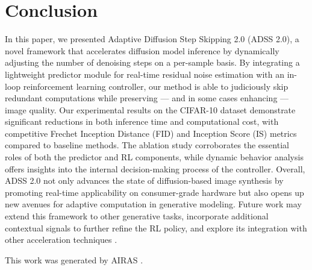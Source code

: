 \documentclass{article} %
\begin{document}
\section{Conclusion}
\label{sec:conclusion}
In this paper, we presented Adaptive Diffusion Step Skipping 2.0 (ADSS 2.0), a novel framework that accelerates diffusion model inference by dynamically adjusting the number of denoising steps on a per-sample basis. By integrating a lightweight predictor module for real-time residual noise estimation with an in-loop reinforcement learning controller, our method is able to judiciously skip redundant computations while preserving --- and in some cases enhancing --- image quality. Our experimental results on the CIFAR-10 dataset demonstrate significant reductions in both inference time and computational cost, with competitive Frechet Inception Distance (FID) and Inception Score (IS) metrics compared to baseline methods. The ablation study corroborates the essential roles of both the predictor and RL components, while dynamic behavior analysis offers insights into the internal decision-making process of the controller. Overall, ADSS 2.0 not only advances the state of diffusion-based image synthesis by promoting real-time applicability on consumer-grade hardware but also opens up new avenues for adaptive computation in generative modeling. Future work may extend this framework to other generative tasks, incorporate additional contextual signals to further refine the RL policy, and explore its integration with other acceleration techniques \cite{li2023faster,moon2024simple}.

This work was generated by \textsc{AIRAS} \cite{airas2025}.



\end{document}
